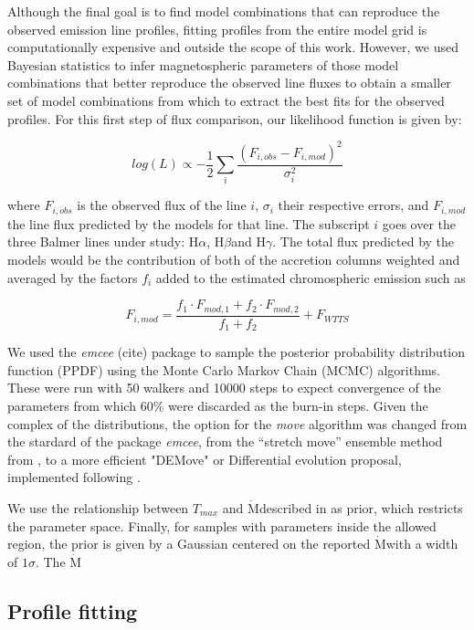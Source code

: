 \documentclass[twocolumn,linenumbers]{aastex631}
\newcommand{\halpha}{H$\alpha$}
\newcommand{\hbeta}{H$\beta$}
\newcommand{\hgamma}{H$\gamma$}
\newcommand{\mdot}{$\dot{\text{M}}$}
\begin{document}
Although the final goal is to find model combinations that can reproduce the observed emission line profiles, fitting profiles from the entire model grid is computationally expensive and outside the scope of this work. However, we used Bayesian statistics to infer magnetospheric parameters of those model combinations that better reproduce the observed line fluxes to obtain a smaller set of model combinations from which to extract the best fits for the observed profiles. For this first step of flux comparison, our likelihood function is given by:

\begin{equation}
    log (L) \propto -\frac{1}{2} \sum_i \frac{(F_{i,obs}-F_{i,mod})^2}{\sigma_{i}^2}
\end{equation}

where $F_{i,obs}$ is the observed flux of the line $i$, $\sigma_i$ their respective errors, and $F_{i,mod}$ the line flux predicted by the models for that line. The subscript $i$ goes over the three Balmer lines under study: \halpha, \hbeta and \hgamma. The total flux predicted by the models would be the contribution of both of the accretion columns weighted and averaged by the factors $f_i$ added to the estimated chromospheric emission such as

\begin{equation}
    F_{i,mod} = \frac{f_1 \cdot F_{mod,1} + f_2 \cdot F_{mod,2}}{f_1 + f_2} + F_{WTTS}
\end{equation}

We used the \textit{emcee} (cite) package to sample the posterior probability distribution function (PPDF) using the Monte Carlo Markov Chain (MCMC) algorithms. These were run with 50 walkers and 10000 steps to expect convergence of the parameters from which 60\% were discarded as the burn-in steps. Given the complex of the distributions, the option for the \textit{move} algorithm was changed from the stardard of the package \textit{emcee}, from the “stretch move” ensemble method from \citet{goodman-weare2010}, to a more efficient  "DEMove" or Differential evolution proposal, implemented following \citet{Nelson_2014}. 

We use the relationship between $T_{max}$ and \mdot described in \citet{muzerolle2001} as prior, which restricts the parameter space. Finally, for samples with parameters inside the allowed region, the prior is given by a Gaussian centered on the reported \mdot with a width of $1\sigma$. The \mdot 

\subsection{Profile fitting}
\end{document}
